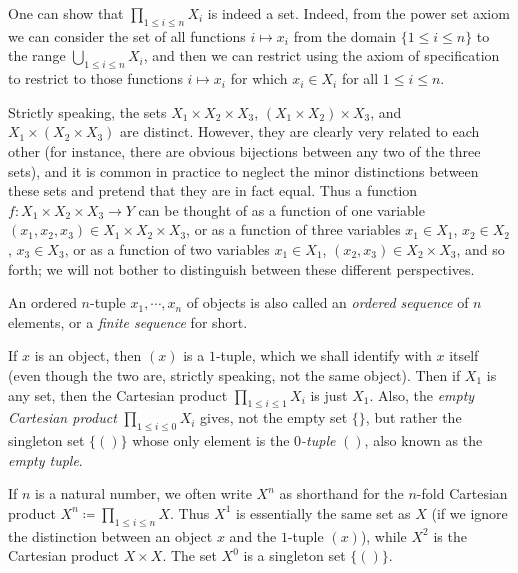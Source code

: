 \begin{remark}\label{3.5.8}
One can show that \(\prod_{1 \leq i \leq n} X_i\) is indeed a set.
Indeed, from the power set axiom we can consider the set of all functions \(i \mapsto x_i\) from the domain \(\{1 \leq i \leq n\}\) to the range \(\bigcup_{1 \leq i \leq n} X_i\), and then we can restrict using the axiom of specification to restrict to those functions \(i \mapsto x_i\) for which \(x_i \in X_i\) for all \(1 \leq i \leq n\).
\end{remark}

Strictly speaking, the sets \(X_1 \times X_2 \times X_3\), \((X_1 \times X_2) \times X_3\), and \(X_1 \times (X_2 \times X_3)\) are distinct.
However, they are clearly very related to each other (for instance, there are obvious bijections between any two of the three sets), and it is common in practice to neglect the minor distinctions between these sets and pretend that they are in fact equal.
Thus a function \(f : X_1 \times X_2 \times X_3 \to Y\) can be thought of as a function of one variable \((x_1, x_2, x_3) \in X_1 \times X_2 \times X_3\), or as a function of three variables \(x_1 \in X_1\), \(x_2 \in X_2\), \(x_3 \in X_3\), or as a function of two variables \(x_1 \in X_1\), \((x_2, x_3) \in X_2 \times X_3\), and so forth;
we will not bother to distinguish between these different perspectives.

\setcounter{theorem}{9}
\begin{remark}\label{3.5.10}
An ordered \(n\)-tuple \(x_1, \cdots, x_n\) of objects is also called an \emph{ordered sequence} of \(n\) elements, or a \emph{finite sequence} for short.
\end{remark}

If \(x\) is an object, then \((x)\) is a \(1\)-tuple, which we shall identify with \(x\) itself (even though the two are, strictly speaking, not the same object).
Then if \(X_1\) is any set, then the Cartesian product \(\prod_{1 \leq i \leq 1} X_i\) is just \(X_1\).
Also, the \emph{empty Cartesian product} \(\prod_{1 \leq i \leq 0} X_i\) gives, not the empty set \(\{\}\), but rather the singleton set \(\{()\}\) whose only element is the \emph{\(0\)-tuple} \(()\), also known as the \emph{empty tuple}.

If \(n\) is a natural number, we often write \(X^n\) as shorthand for the \(n\)-fold Cartesian product \(X^n \coloneqq \prod_{1 \leq i \leq n} X\).
Thus \(X^1\) is essentially the same set as \(X\) (if we ignore the distinction between an object \(x\) and the \(1\)-tuple \((x)\)), while \(X^2\) is the Cartesian product \(X \times X\).
The set \(X^0\) is a singleton set \(\{()\}\).

